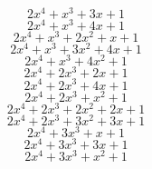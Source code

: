 \documentclass{article}
\begin{document}
\begin{dmath*}
2 x^{4}+x^{3}+3 x +1
\end{dmath*}
\vspace{-\bigskipamount}
\begin{dmath*}
2 x^{4}+x^{3}+4 x +1
\end{dmath*}
\vspace{-\bigskipamount}
\begin{dmath*}
2 x^{4}+x^{3}+2 x^{2}+x +1
\end{dmath*}
\vspace{-\bigskipamount}
\begin{dmath*}
2 x^{4}+x^{3}+3 x^{2}+4 x +1
\end{dmath*}
\vspace{-\bigskipamount}
\begin{dmath*}
2 x^{4}+x^{3}+4 x^{2}+1
\end{dmath*}
\vspace{-\bigskipamount}
\begin{dmath*}
2 x^{4}+2 x^{3}+2 x +1
\end{dmath*}
\vspace{-\bigskipamount}
\begin{dmath*}
2 x^{4}+2 x^{3}+4 x +1
\end{dmath*}
\vspace{-\bigskipamount}
\begin{dmath*}
2 x^{4}+2 x^{3}+x^{2}+1
\end{dmath*}
\vspace{-\bigskipamount}
\begin{dmath*}
2 x^{4}+2 x^{3}+2 x^{2}+2 x +1
\end{dmath*}
\vspace{-\bigskipamount}
\begin{dmath*}
2 x^{4}+2 x^{3}+3 x^{2}+3 x +1
\end{dmath*}
\vspace{-\bigskipamount}
\begin{dmath*}
2 x^{4}+3 x^{3}+x +1
\end{dmath*}
\vspace{-\bigskipamount}
\begin{dmath*}
2 x^{4}+3 x^{3}+3 x +1
\end{dmath*}
\vspace{-\bigskipamount}
\begin{dmath*}
2 x^{4}+3 x^{3}+x^{2}+1
\end{dmath*}
\end{document}
